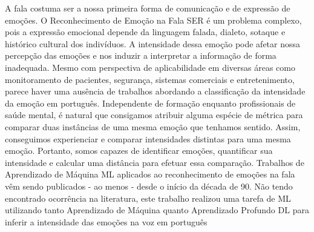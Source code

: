 A fala costuma ser a nossa primeira forma de comunicação e de expressão de emoções. O Reconhecimento de Emoção na Fala \acrfull{SER} é um problema complexo, pois a expressão emocional depende da linguagem falada, dialeto, sotaque e histórico cultural dos indivíduos. A intensidade dessa emoção pode afetar nossa percepção das emoções e nos induzir a interpretar a informação de forma inadequada. Mesmo com perspectiva de aplicabilidade em diversas áreas como monitoramento de pacientes, segurança, sistemas comerciais e entretenimento, parece haver uma ausência de trabalhos abordando a classificação da intensidade da emoção em português. Independente de formação enquanto profissionais de saúde mental, é natural que consigamos atribuir alguma espécie de métrica para comparar duas instâncias de uma mesma emoção que tenhamos sentido. Assim, conseguimos experienciar e comparar intensidades distintas para uma mesma emoção. Portanto, somos capazes de identificar emoções, quantificar sua intensidade e calcular uma distância para efetuar essa comparação. Trabalhos de Aprendizado de Máquina \acrfull{ML} aplicados ao reconhecimento de emoções na fala vêm sendo publicados - ao menos - desde o início da década de 90. Não tendo encontrado ocorrência na literatura, este trabalho realizou uma tarefa de \acrshort{ML} utilizando tanto Aprendizado de Máquina quanto Aprendizado Profundo \acrfull{DL} para inferir a intensidade das emoções na voz em português